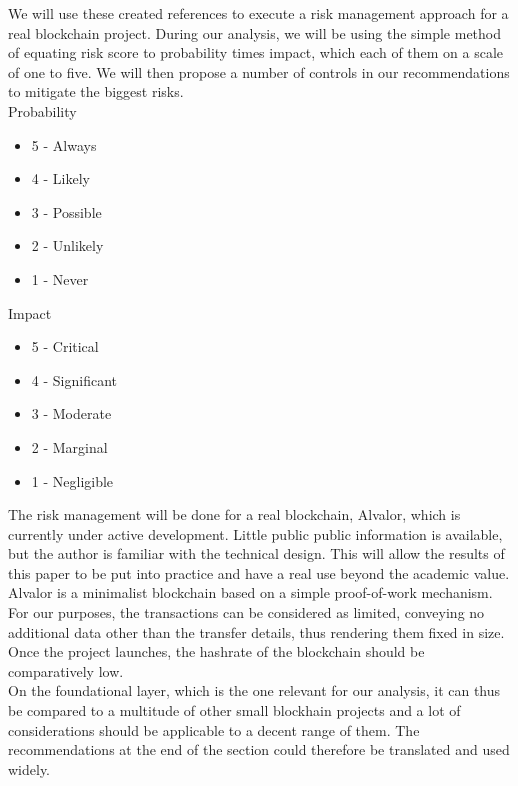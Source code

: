 \documentclass[12pt,a4paper]{article}
\begin{document}
We will use these created references to execute a risk management approach for a real blockchain project. During our analysis, we will be using the simple method of equating risk score to probability times impact, which each of them on a scale of one to five. We will then propose a number of controls in our recommendations to mitigate the biggest risks.\\

Probability
\begin{itemize}
  \item 5 - Always
  \item 4 - Likely
  \item 3 - Possible
  \item 2 - Unlikely
  \item 1 - Never
\end{itemize}

Impact
\begin{itemize}
  \item 5 - Critical
  \item 4 - Significant
  \item 3 - Moderate
  \item 2 - Marginal
  \item 1 - Negligible
\end{itemize}

The risk management will be done for a real \gls{blockchain}, Alvalor, which is currently under active development. Little public public information is available, but the author is familiar with the technical design. This will allow the results of this paper to be put into practice and have a real use beyond the academic value.\\

Alvalor is a minimalist \gls{blockchain} based on a simple proof-of-work mechanism. For our purposes, the \glspl{transaction} can be considered as limited, conveying no additional data other than the transfer details, thus rendering them fixed in size. Once the project launches, the \gls{hashrate} of the \gls{blockchain} should be comparatively low.\\

On the foundational layer, which is the one relevant for our analysis, it can thus be compared to a multitude of other small blockhain projects and a lot of considerations should be applicable to a decent range of them. The recommendations at the end of the section could therefore be translated and used widely.\\
\end{document}
